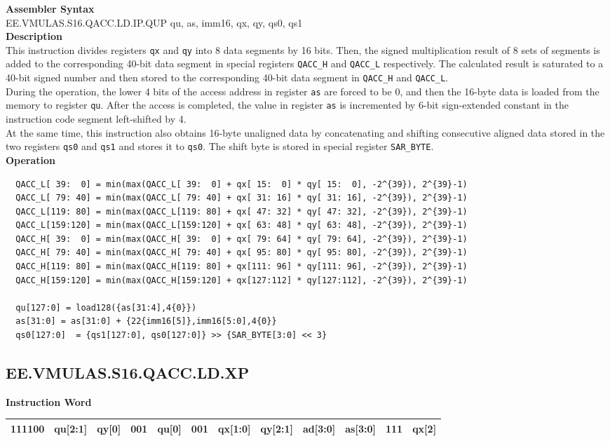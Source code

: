 \textbf{Assembler Syntax} \\
EE.VMULAS.S16.QACC.LD.IP.QUP qu, as, imm16, qx, qy, qs0, qs1 \\
\textbf{Description} \\
This instruction divides registers \lstinline{qx} and \lstinline{qy} into 8 data segments by 16 bits. Then, the signed multiplication result of 8 sets of segments is added to the corresponding 40-bit data segment in special registers \lstinline{QACC_H} and \lstinline{QACC_L} respectively. The calculated result is saturated to a 40-bit signed number and then stored to the corresponding 40-bit data segment in \lstinline{QACC_H} and \lstinline{QACC_L}.\\
During the operation, the lower 4 bits of the access address in register \lstinline{as} are forced to be 0, and then the 16-byte data is loaded from the memory to register \lstinline{qu}. After the access is completed, the value in register \lstinline{as} is incremented by 6-bit sign-extended constant in the instruction code segment left-shifted by 4.\\
At the same time, this instruction also obtains 16-byte unaligned data by concatenating and shifting consecutive aligned data stored in the two registers \lstinline{qs0} and \lstinline{qs1} and stores it to \lstinline{qs0}. The shift byte is stored in special register \lstinline{SAR_BYTE}.\\
\textbf{Operation}
\begin{lstlisting}
  QACC_L[ 39:  0] = min(max(QACC_L[ 39:  0] + qx[ 15:  0] * qy[ 15:  0], -2^{39}), 2^{39}-1)
  QACC_L[ 79: 40] = min(max(QACC_L[ 79: 40] + qx[ 31: 16] * qy[ 31: 16], -2^{39}), 2^{39}-1)
  QACC_L[119: 80] = min(max(QACC_L[119: 80] + qx[ 47: 32] * qy[ 47: 32], -2^{39}), 2^{39}-1)
  QACC_L[159:120] = min(max(QACC_L[159:120] + qx[ 63: 48] * qy[ 63: 48], -2^{39}), 2^{39}-1)
  QACC_H[ 39:  0] = min(max(QACC_H[ 39:  0] + qx[ 79: 64] * qy[ 79: 64], -2^{39}), 2^{39}-1)
  QACC_H[ 79: 40] = min(max(QACC_H[ 79: 40] + qx[ 95: 80] * qy[ 95: 80], -2^{39}), 2^{39}-1)
  QACC_H[119: 80] = min(max(QACC_H[119: 80] + qx[111: 96] * qy[111: 96], -2^{39}), 2^{39}-1)
  QACC_H[159:120] = min(max(QACC_H[159:120] + qx[127:112] * qy[127:112], -2^{39}), 2^{39}-1)

  qu[127:0] = load128({as[31:4],4{0}})
  as[31:0] = as[31:0] + {22{imm16[5]},imm16[5:0],4{0}}
  qs0[127:0]  = {qs1[127:0], qs0[127:0]} >> {SAR_BYTE[3:0] << 3}
\end{lstlisting}

\clearpage
\subsection{EE.VMULAS.S16.QACC.LD.XP}\label{instruction:EEVMULASS16QACCLDXP}
\setlength\tabcolsep{6pt}
\textbf{Instruction Word} \\
\begin{tabular}{|c|c|c|c|c|c|c|c|c|c|c|c|}
	\hline
	111100 & qu[2:1] & qy[0] & 001 & qu[0] & 001 & qx[1:0] & qy[2:1] & ad[3:0] & as[3:0] & 111 & qx[2] \\
	\hline
\end{tabular}

